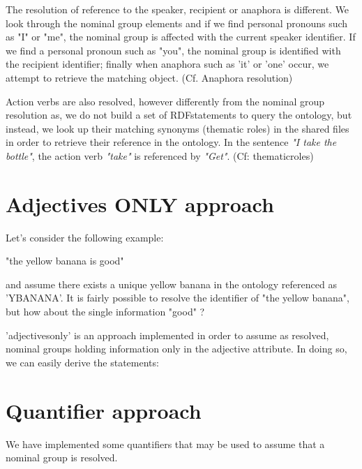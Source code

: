 \documentclass[twoside,a4paper,10pt]{report}
\newcommand{\dokutitleleveltree}[1]{\section{#1}}
\newcommand{\dokufootmark}[1]{\footnotemark[#1]}
\newcommand{\dokuitalic}[1]{\textsl{#1}}
\begin{document}
\small
\begin{verbatimtab}
\end{verbatimtab}
\normalsize

The resolution of reference to the speaker, recipient or anaphora is different. We look through the nominal group elements and if we find personal pronouns such as "I" or "me", the nominal group is affected with the current speaker identifier.
 If we find a personal pronoun such as "you", the nominal group is identified with the recipient identifier; finally when anaphora such as 'it' or 'one' occur, we attempt to retrieve the matching object. (Cf. Anaphora resolution)


Action verbs are also resolved, however differently from the nominal group resolution as, we do not build a set of RDF\dokufootmark{1} statements to query the ontology, but instead, we look up their matching synonyms (thematic roles) in the shared files in order to retrieve their reference in the ontology. In the sentence \dokuitalic{"I take the bottle"}, the action verb \dokuitalic{"take"} is referenced by \dokuitalic{"Get"}. (Cf: thematic{\textunderscore}roles)


\dokutitleleveltree{Adjectives ONLY approach}
\label{7ab02d5628e7f210c5eb8e862e7ddc56}%

Let's consider the following example:


\small
\begin{verbatimtab}
  "the yellow banana is good" 
\end{verbatimtab}
\normalsize
and assume there exists a unique yellow banana in the ontology referenced as 'Y{\textunderscore}BANANA'.
It is fairly possible to resolve the identifier of "the yellow banana", but how about the single information "good" ?

'adjectives{\textunderscore}only' is an approach implemented in order to assume as resolved, nominal groups holding information only in the adjective attribute.
In doing so, we can easily derive the statements: 


\small
\begin{verbatimtab}
\end{verbatimtab}
\normalsize

\dokutitleleveltree{Quantifier approach}
\label{3c48ef2a7bfacf5e512a249e797564d3}%

We have implemented some quantifiers that may be used to assume that a nominal group is resolved.
\end{document}
